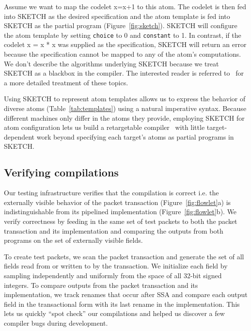 Assume we want to map the codelet x=x+1 to this atom. The codelet is then fed
into SKETCH as the desired specification and the atom template is fed into
SKETCH as the partial program (Figure~\ref{fig:sketch}). SKETCH will configure
the atom template by setting \texttt{choice} to 0 and \texttt{constant} to 1.
In contrast, if the codelet x = x * x was supplied as the specification, SKETCH
will return an error because the specification cannot be mapped to any of the
atom's computations. We don't describe the algorithms underlying SKETCH because
we treat SKETCH as a blackbox in the \pktlanguage compiler. The interested
reader is referred to~\cite{bitstreaming, sketch_asplos} for a more detailed
treatment of these topics.

Using SKETCH to represent atom templates allows us to express the behavior of
diverse atoms (Table~\ref{tab:templates}) using a natural imperative syntax.
Because different \absmachine machines only differ in the atoms they provide,
employing SKETCH for atom configuration lets us build a retargetable
compiler~\cite{lcc} with little target-dependent work beyond specifying each
target's atoms as partial programs in SKETCH.

\subsection{Verifying compilations}
\label{ss:verification}

Our testing infrastructure verifies that the compilation is correct i.e. the
externally visible behavior of the packet transaction
(Figure~\ref{fig:flowlet}a) is indistinguishable from its pipelined
implementation (Figure~\ref{fig:flowlet}b). We verify correctness by feeding in
the same set of test packets to both the packet transaction and its
implementation and comparing the outputs from both programs on the set of
externally visible fields.

To create test packets, we scan the packet transaction and generate the set of
all fields read from or written to by the transaction. We initialize each field
by sampling independently and uniformly from the space of all 32-bit signed
integers.  To compare outputs from the packet transaction and its
implementation, we track renames that occur after SSA and compare each output
field in the transactional form with its last rename in the implementation.
This lets us quickly ``spot check'' our compilations and helped us discover a
few compiler bugs during development.

